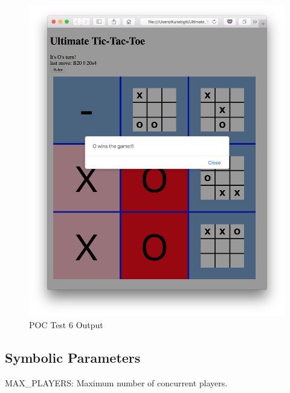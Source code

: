 \documentclass[12pt, titlepage]{article}
\begin{document}
\begin{figure}
  \includegraphics[width=\linewidth]{Figures/Test6-output.png}
  \caption{POC Test 6 Output}
  \label{fig:Test6_output}
\end{figure}

\subsection{Symbolic Parameters}

MAX\_PLAYERS: Maximum number of concurrent players.
\end{document}
